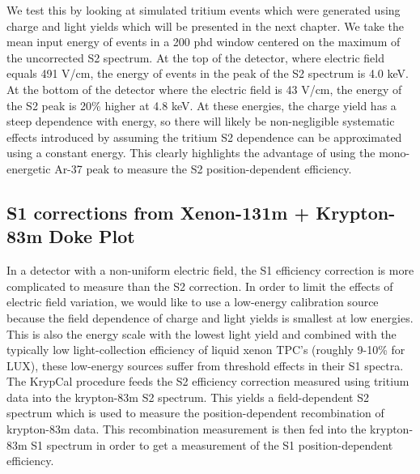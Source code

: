 We test this by looking at simulated tritium events which were generated using charge and light yields which will be presented in the next chapter. We take the mean input energy of events in a 200 phd window centered on the maximum of the uncorrected S2 spectrum. At the top of the detector, where electric field equals 491 V/cm, the energy of events in the peak of the S2 spectrum is 4.0 keV. At the bottom of the detector where the electric field is 43 V/cm, the energy of the S2 peak is 20\% higher at 4.8 keV. At these energies, the charge yield has a steep dependence with energy, so there will likely be non-negligible systematic effects introduced by assuming the tritium S2 dependence can be approximated using a constant energy. This clearly highlights the advantage of using the mono-energetic Ar-37 peak to measure the S2 position-dependent efficiency.

\subsection{S1 corrections from Xenon-131m + Krypton-83m Doke Plot}\label{sec:s1dokeplot}
In a detector with a non-uniform electric field, the S1 efficiency correction is more complicated to measure than the S2 correction. In order to limit the effects of electric field variation, we would like to use a low-energy calibration source because the field dependence of charge and light yields is smallest at low energies. This is also the energy scale with the lowest light yield and combined with the typically low light-collection efficiency of liquid xenon TPC's (roughly 9-10\% for LUX), these low-energy sources suffer from threshold effects in their S1 spectra. The KrypCal procedure feeds the S2 efficiency correction measured using tritium data into the krypton-83m S2 spectrum. This yields a field-dependent S2 spectrum which is used to measure the position-dependent recombination of krypton-83m data. This recombination measurement is then fed into the krypton-83m S1 spectrum in order to get a measurement of the S1 position-dependent efficiency.

